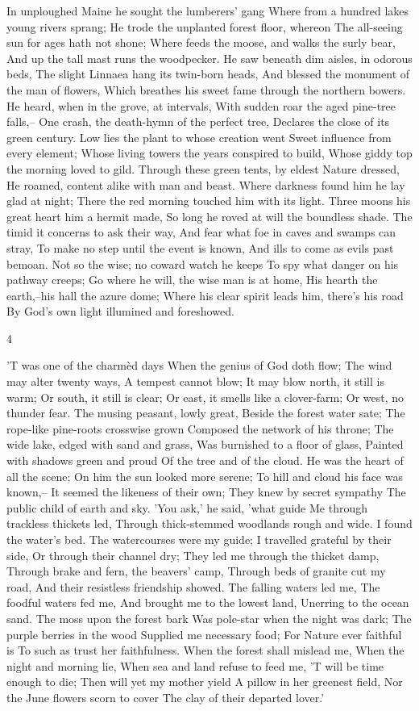 In unploughed Maine he sought the lumberers' gang
Where from a hundred lakes young rivers sprang;
He trode the unplanted forest floor, whereon
The all-seeing sun for ages hath not shone;
Where feeds the moose, and walks the surly bear,
And up the tall mast runs the woodpecker.
He saw beneath dim aisles, in odorous beds,
The slight Linnaea hang its twin-born heads,
And blessed the monument of the man of flowers,
Which breathes his sweet fame through the northern bowers.
He heard, when in the grove, at intervals,
With sudden roar the aged pine-tree falls,--
One crash, the death-hymn of the perfect tree,
Declares the close of its green century.
Low lies the plant to whose creation went
Sweet influence from every element;
Whose living towers the years conspired to build,
Whose giddy top the morning loved to gild.
Through these green tents, by eldest Nature dressed,
He roamed, content alike with man and beast.
Where darkness found him he lay glad at night;
There the red morning touched him with its light.
Three moons his great heart him a hermit made,
So long he roved at will the boundless shade.
The timid it concerns to ask their way,
And fear what foe in caves and swamps can stray,
To make no step until the event is known,
And ills to come as evils past bemoan.
Not so the wise; no coward watch he keeps
To spy what danger on his pathway creeps;
Go where he will, the wise man is at home,
His hearth the earth,--his hall the azure dome;
Where his clear spirit leads him, there's his road
By God's own light illumined and foreshowed.

4

'T was one of the charmèd days
When the genius of God doth flow;
The wind may alter twenty ways,
A tempest cannot blow;
It may blow north, it still is warm;
Or south, it still is clear;
Or east, it smells like a clover-farm;
Or west, no thunder fear.
The musing peasant, lowly great,
Beside the forest water sate;
The rope-like pine-roots crosswise grown
Composed the network of his throne;
The wide lake, edged with sand and grass,
Was burnished to a floor of glass,
Painted with shadows green and proud
Of the tree and of the cloud.
He was the heart of all the scene;
On him the sun looked more serene;
To hill and cloud his face was known,--
It seemed the likeness of their own;
They knew by secret sympathy
The public child of earth and sky.
'You ask,' he said, 'what guide
Me through trackless thickets led,
Through thick-stemmed woodlands rough and wide.
I found the water's bed.
The watercourses were my guide;
I travelled grateful by their side,
Or through their channel dry;
They led me through the thicket damp,
Through brake and fern, the beavers' camp,
Through beds of granite cut my road,
And their resistless friendship showed.
The falling waters led me,
The foodful waters fed me,
And brought me to the lowest land,
Unerring to the ocean sand.
The moss upon the forest bark
Was pole-star when the night was dark;
The purple berries in the wood
Supplied me necessary food;
For Nature ever faithful is
To such as trust her faithfulness.
When the forest shall mislead me,
When the night and morning lie,
When sea and land refuse to feed me,
'T will be time enough to die;
Then will yet my mother yield
A pillow in her greenest field,
Nor the June flowers scorn to cover
The clay of their departed lover.'

